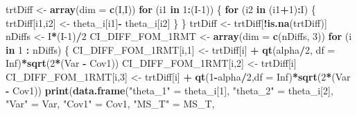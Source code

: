 \documentclass[
]{book}
\newenvironment{Shaded}{\begin{snugshade}}{\end{snugshade}}
\newcommand{\ControlFlowTok}[1]{\textcolor[rgb]{0.13,0.29,0.53}{\textbf{#1}}}
\newcommand{\DataTypeTok}[1]{\textcolor[rgb]{0.13,0.29,0.53}{#1}}
\newcommand{\DecValTok}[1]{\textcolor[rgb]{0.00,0.00,0.81}{#1}}
\newcommand{\KeywordTok}[1]{\textcolor[rgb]{0.13,0.29,0.53}{\textbf{#1}}}
\newcommand{\NormalTok}[1]{#1}
\newcommand{\OperatorTok}[1]{\textcolor[rgb]{0.81,0.36,0.00}{\textbf{#1}}}
\newcommand{\OtherTok}[1]{\textcolor[rgb]{0.56,0.35,0.01}{#1}}
\newcommand{\StringTok}[1]{\textcolor[rgb]{0.31,0.60,0.02}{#1}}
\begin{document}
\begin{Shaded}
\begin{Highlighting}[]
\NormalTok{trtDiff \textless{}{-}}\StringTok{ }\KeywordTok{array}\NormalTok{(}\DataTypeTok{dim =} \KeywordTok{c}\NormalTok{(I,I))}
\ControlFlowTok{for}\NormalTok{ (i1 }\ControlFlowTok{in} \DecValTok{1}\OperatorTok{:}\NormalTok{(I}\DecValTok{{-}1}\NormalTok{)) \{    }
  \ControlFlowTok{for}\NormalTok{ (i2 }\ControlFlowTok{in}\NormalTok{ (i1}\OperatorTok{+}\DecValTok{1}\NormalTok{)}\OperatorTok{:}\NormalTok{I) \{}
\NormalTok{    trtDiff[i1,i2] \textless{}{-}}\StringTok{ }\NormalTok{theta\_i[i1]}\OperatorTok{{-}}\StringTok{ }\NormalTok{theta\_i[i2]    }
\NormalTok{  \}}
\NormalTok{\}}
\NormalTok{trtDiff \textless{}{-}}\StringTok{ }\NormalTok{trtDiff[}\OperatorTok{!}\KeywordTok{is.na}\NormalTok{(trtDiff)]}
\NormalTok{nDiffs \textless{}{-}}\StringTok{ }\NormalTok{I}\OperatorTok{*}\NormalTok{(I}\DecValTok{{-}1}\NormalTok{)}\OperatorTok{/}\DecValTok{2}
\NormalTok{CI\_DIFF\_FOM\_1RMT \textless{}{-}}\StringTok{ }\KeywordTok{array}\NormalTok{(}\DataTypeTok{dim =} \KeywordTok{c}\NormalTok{(nDiffs, }\DecValTok{3}\NormalTok{))}
\ControlFlowTok{for}\NormalTok{ (i }\ControlFlowTok{in} \DecValTok{1} \OperatorTok{:}\StringTok{ }\NormalTok{nDiffs) \{}
\NormalTok{  CI\_DIFF\_FOM\_1RMT[i,}\DecValTok{1}\NormalTok{] \textless{}{-}}\StringTok{ }\NormalTok{trtDiff[i] }\OperatorTok{+}\StringTok{ }\KeywordTok{qt}\NormalTok{(alpha}\OperatorTok{/}\DecValTok{2}\NormalTok{,  }\DataTypeTok{df =} \OtherTok{Inf}\NormalTok{)}\OperatorTok{*}\KeywordTok{sqrt}\NormalTok{(}\DecValTok{2}\OperatorTok{*}\NormalTok{(Var }\OperatorTok{{-}}\StringTok{ }\NormalTok{Cov1))}
\NormalTok{  CI\_DIFF\_FOM\_1RMT[i,}\DecValTok{2}\NormalTok{] \textless{}{-}}\StringTok{ }\NormalTok{trtDiff[i]}
\NormalTok{  CI\_DIFF\_FOM\_1RMT[i,}\DecValTok{3}\NormalTok{] \textless{}{-}}\StringTok{ }\NormalTok{trtDiff[i] }\OperatorTok{+}\StringTok{ }\KeywordTok{qt}\NormalTok{(}\DecValTok{1}\OperatorTok{{-}}\NormalTok{alpha}\OperatorTok{/}\DecValTok{2}\NormalTok{,}\DataTypeTok{df =} \OtherTok{Inf}\NormalTok{)}\OperatorTok{*}\KeywordTok{sqrt}\NormalTok{(}\DecValTok{2}\OperatorTok{*}\NormalTok{(Var }\OperatorTok{{-}}\StringTok{ }\NormalTok{Cov1))}
  \KeywordTok{print}\NormalTok{(}\KeywordTok{data.frame}\NormalTok{(}\StringTok{"theta\_1"}\NormalTok{ =}\StringTok{ }\NormalTok{theta\_i[}\DecValTok{1}\NormalTok{],}
                   \StringTok{"theta\_2"}\NormalTok{ =}\StringTok{ }\NormalTok{theta\_i[}\DecValTok{2}\NormalTok{],}
                   \StringTok{"Var"}\NormalTok{ =}\StringTok{ }\NormalTok{Var,}
                   \StringTok{"Cov1"}\NormalTok{ =}\StringTok{ }\NormalTok{Cov1,}
                   \StringTok{"MS\_T"}\NormalTok{ =}\StringTok{ }\NormalTok{MS\_T,}

\end{Highlighting}
\end{Shaded}
\end{document}
